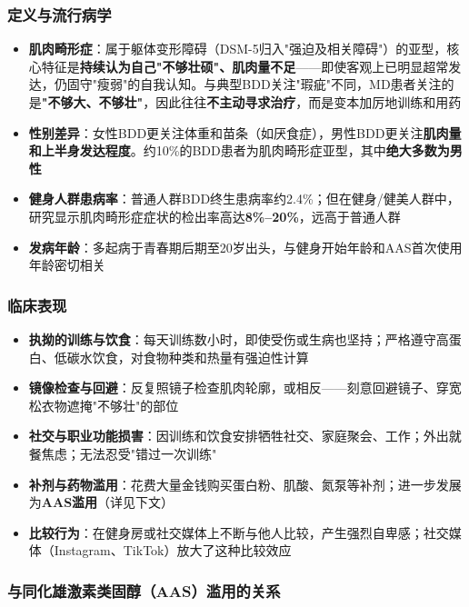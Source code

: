 \subsubsection{定义与流行病学}

\begin{itemize}[leftmargin=2cm]
	\item \textbf{肌肉畸形症}：属于躯体变形障碍（DSM-5归入"强迫及相关障碍"）的亚型，核心特征是\textbf{持续认为自己"不够壮硕"、肌肉量不足}——即使客观上已明显超常发达，仍固守"瘦弱"的自我认知。与典型BDD关注"瑕疵"不同，MD患者关注的是\textbf{"不够大、不够壮"}，因此往往\textbf{不主动寻求治疗}，而是变本加厉地训练和用药
	\item \textbf{性别差异}：女性BDD更关注体重和苗条（如厌食症），男性BDD更关注\textbf{肌肉量和上半身发达程度}。约10\%的BDD患者为肌肉畸形症亚型，其中\textbf{绝大多数为男性}
	\item \textbf{健身人群患病率}：普通人群BDD终生患病率约2.4\%；但在健身/健美人群中，研究显示肌肉畸形症症状的检出率高达\textbf{8\%--20\%}，远高于普通人群
	\item \textbf{发病年龄}：多起病于青春期后期至20岁出头，与健身开始年龄和AAS首次使用年龄密切相关
\end{itemize}

\subsubsection{临床表现}

\begin{itemize}[leftmargin=2cm]
	\item \textbf{执拗的训练与饮食}：每天训练数小时，即使受伤或生病也坚持；严格遵守高蛋白、低碳水饮食，对食物种类和热量有强迫性计算
	\item \textbf{镜像检查与回避}：反复照镜子检查肌肉轮廓，或相反——刻意回避镜子、穿宽松衣物遮掩"不够壮"的部位
	\item \textbf{社交与职业功能损害}：因训练和饮食安排牺牲社交、家庭聚会、工作；外出就餐焦虑；无法忍受"错过一次训练"
	\item \textbf{补剂与药物滥用}：花费大量金钱购买蛋白粉、肌酸、氮泵等补剂；进一步发展为\textbf{AAS滥用}（详见下文）
	\item \textbf{比较行为}：在健身房或社交媒体上不断与他人比较，产生强烈自卑感；社交媒体（Instagram、TikTok）放大了这种比较效应
\end{itemize}

\subsubsection{与同化雄激素类固醇（AAS）滥用的关系}

